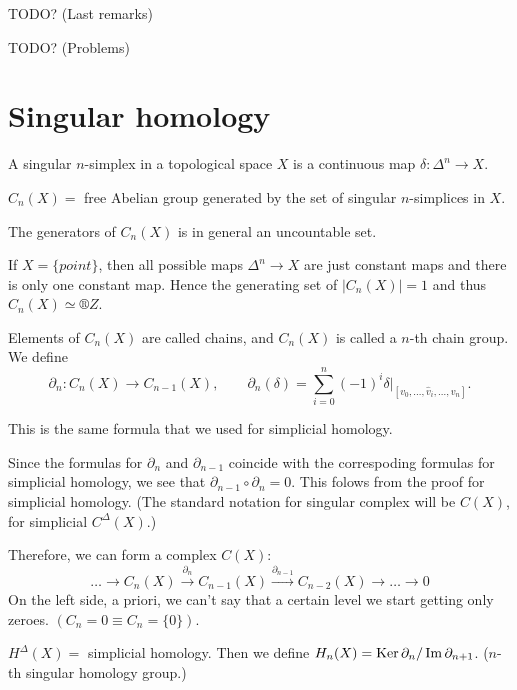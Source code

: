 \documentclass[12pt]{article}					%
\begin{document}
TODO? (Last remarks)


TODO? (Problems)


\section{Singular homology}
\begin{definice}
	A singular $n$-simplex in a topological space $X$ is a continuous map $δ: Δ^n \rightarrow X$.

	$C_n(X)=$ free Abelian group generated by the set of singular $n$-simplices in $X$.

	\begin{poznamkain}
		The generators of $C_n(X)$ is in general an uncountable set.

		If $X = \{point\}$, then all possible maps $Δ^n \rightarrow X$ are just constant maps and there is only one constant map. Hence the generating set of $|C_n(X)| = 1$ and thus $C_n(X) \simeq ®Z$.
	\end{poznamkain}

	Elements of $C_n(X)$ are called chains, and $C_n(X)$ is called a $n$-th chain group. We define
	$$ \partial_n: C_n(X) \rightarrow C_{n-1}(X), \qquad \partial_n(δ) = \sum_{i=0}^n (-1)^i δ|_{[v_0, …, \hat{v}_i, …, v_n]}. $$

	\begin{poznamkain}
		This is the same formula that we used for simplicial homology.

		Since the formulas for $\partial_n$ and $\partial_{n-1}$ coincide with the correspoding formulas for simplicial homology, we see that $\partial_{n-1} ∘ \partial_n = 0$. This folows from the proof for simplicial homology. (The standard notation for singular complex will be $C(X)$, for simplicial $C^Δ(X)$.)

		Therefore, we can form a complex $C(X)$:
		$$ … \rightarrow C_n(X) \overset{\partial_n}\rightarrow C_{n-1}(X) \overset{\partial_{n-1}}\rightarrow C_{n-2}(X) \rightarrow … \rightarrow 0 $$
		On the left side, a priori, we can't say that a certain level we start getting only zeroes. $(C_n = 0 ≡ C_n = \{0\}).$
	\end{poznamkain}

	$H^Δ(X) = $ simplicial homology. Then we define $H_n(X) = \operatorname{Ker} \partial_n / \operatorname{Im} \partial_{n+1}$. ($n$-th singular homology group.)
\end{definice}
\end{document}
